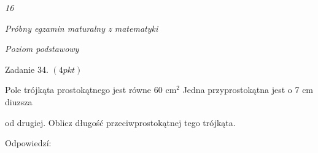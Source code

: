 \documentclass[a4paper,12pt]{article}
\begin{document}
{\it 16}

{\it Próbny egzamin maturalny z matematyki}

{\it Poziom podstawowy}

Zadanie 34. $(4pkt)$

Pole trójkąta prostokątnego jest równe 60 $\mathrm{c}\mathrm{m}^{2}$ Jedna przyprostokątna jest o 7 cm diuzsza

od drugiej. Oblicz długość przeciwprostokątnej tego trójkąta.

Odpowiedzí:
\end{document}
